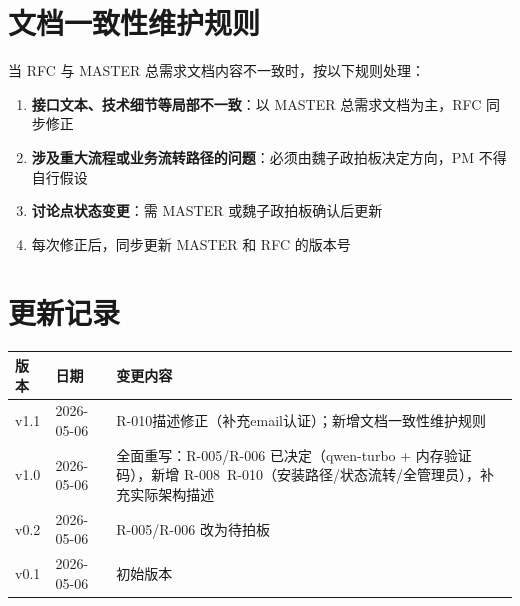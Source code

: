 \documentclass[11pt,a4paper]{article}
\begin{document}
\section{文档一致性维护规则}

当 RFC 与 MASTER 总需求文档内容不一致时，按以下规则处理：
\begin{enumerate}[nosep]
  \item \textbf{接口文本、技术细节等局部不一致}：以 MASTER 总需求文档为主，RFC 同步修正
  \item \textbf{涉及重大流程或业务流转路径的问题}：必须由魏子政拍板决定方向，PM 不得自行假设
  \item \textbf{讨论点状态变更}：需 MASTER 或魏子政拍板确认后更新
  \item 每次修正后，同步更新 MASTER 和 RFC 的版本号
\end{enumerate}

\section*{更新记录}

\begin{tabular}{lll}
\toprule
版本 & 日期 & 变更内容 \\
\midrule
v1.1 & 2026-05-06 & R-010描述修正（补充email认证）；新增文档一致性维护规则 \\
v1.0 & 2026-05-06 & 全面重写：R-005/R-006 已决定（qwen-turbo + 内存验证码），新增 R-008~R-010（安装路径/状态流转/全管理员），补充实际架构描述 \\
v0.2 & 2026-05-06 & R-005/R-006 改为待拍板 \\
v0.1 & 2026-05-06 & 初始版本 \\
\bottomrule
\end{tabular}
\end{document}
